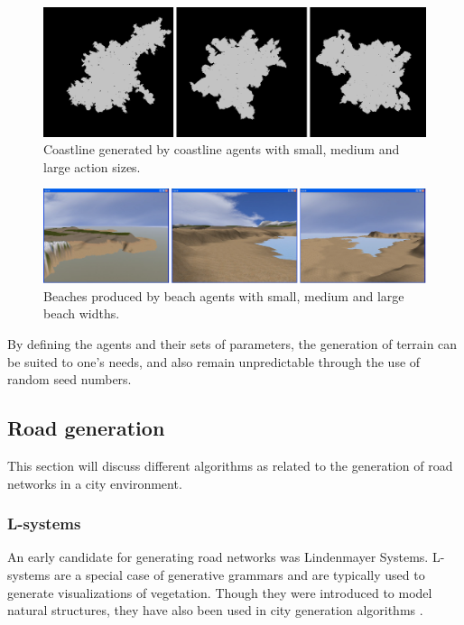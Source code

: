 \begin{figure}[H]
    \centering
    \includegraphics[width = 1\linewidth]{Planning report/images/coastline.PNG}
    \caption{Coastline generated by coastline agents with small, medium and large action sizes.}
    \label{fig:coastline}
\end{figure}
\begin{figure}[H]
    \centering
    \includegraphics[width = 1\linewidth]{Planning report/images/beach.PNG}
    \caption{Beaches produced by beach agents with small, medium and large beach widths.}
    \label{fig:beach}
\end{figure}

By defining the agents and their sets of parameters, the generation of terrain can be suited to one's needs, and also remain unpredictable through the use of random seed numbers.

\subsection{Road generation}
This section will discuss different algorithms as related to the generation of road networks in a city environment.

\subsubsection{L-systems}
An early candidate for generating road networks was Lindenmayer Systems. L-systems are a special case of generative grammars and are typically used to generate visualizations of vegetation. Though they were introduced to model natural structures, they have also been used in city generation algorithms \cite{yoav-pascal}. 

